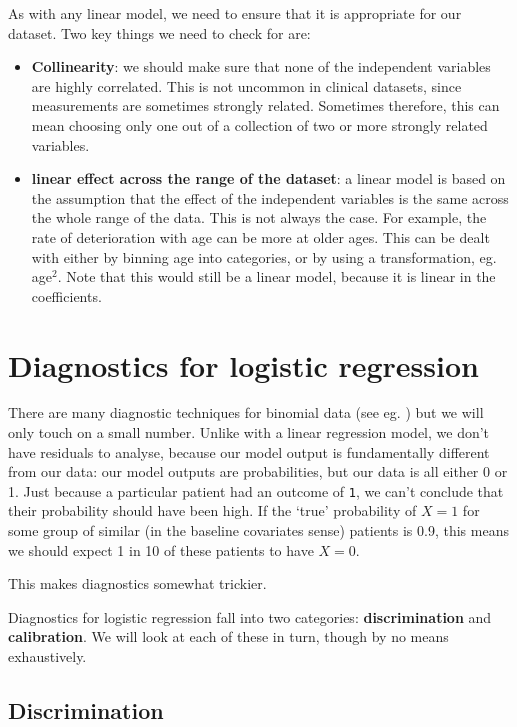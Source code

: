 \documentclass[
  openany]{book}
\providecommand{\tightlist}{%
  \setlength{\itemsep}{0pt}\setlength{\parskip}{0pt}}
\theoremstyle{definition}
\theoremstyle{definition}
\theoremstyle{definition}
\theoremstyle{definition}
\theoremstyle{remark}
\begin{document}
As with any linear model, we need to ensure that it is appropriate for our dataset. Two key things we need to check for are:

\begin{itemize}
\tightlist
\item
  \textbf{Collinearity}: we should make sure that none of the independent variables are highly correlated. This is not uncommon in clinical datasets, since measurements are sometimes strongly related. Sometimes therefore, this can mean choosing only one out of a collection of two or more strongly related variables.
\item
  \textbf{linear effect across the range of the dataset}: a linear model is based on the assumption that the effect of the independent variables is the same across the whole range of the data. This is not always the case. For example, the rate of deterioration with age can be more at older ages. This can be dealt with either by binning age into categories, or by using a transformation, eg. age\(^2\). Note that this would still be a linear model, because it is linear in the coefficients.
\end{itemize}

\hypertarget{diaglogreg}{%
\section{Diagnostics for logistic regression}\label{diaglogreg}}

There are many diagnostic techniques for binomial data (see eg. \citet{collett_bin}) but we will only touch on a small number. Unlike with a linear regression model, we don't have residuals to analyse, because our model output is fundamentally different from our data: our model outputs are probabilities, but our data is all either 0 or 1. Just because a particular patient had an outcome of \texttt{1}, we can't conclude that their probability should have been high. If the `true' probability of \(X=1\) for some group of similar (in the baseline covariates sense) patients is 0.9, this means we should expect 1 in 10 of these patients to have \(X=0\).

This makes diagnostics somewhat trickier.

Diagnostics for logistic regression fall into two categories: \textbf{discrimination} and \textbf{calibration}. We will look at each of these in turn, though by no means exhaustively.

\hypertarget{discrimination}{%
\subsection{Discrimination}\label{discrimination}}
\end{document}

